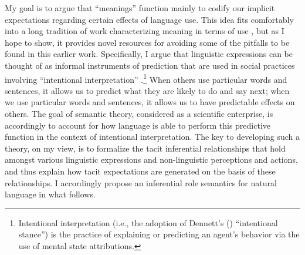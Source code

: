 My goal is to argue that ``meanings'' function mainly to codify our implicit expectations regarding certain effects of language use. This idea fits comfortably into a long tradition of work characterizing meaning in terms of use \citep{Sellars:1954,Wittgenstein:1953,Sellars:1953,Harman:1982,Block:1986,Brandom:1994,Brandom:2000,Brandom:2009,Horwich:2005}, but as I hope to show, it provides novel resources for avoiding some of the pitfalls to be found in this earlier work. Specifically, I argue that linguistic expressions can be thought of as informal instruments of prediction that are used in social practices involving ``intentional interpretation'' \citep{Dennett:1987,Brandom:1994}.\footnote{Intentional interpretation (i.e., the adoption of Dennett's (\citeyear{Dennett:1987,Dennett:1991}) ``intentional stance'') is the practice of explaining or predicting an agent’s behavior via the use of mental state attributions.} When others use particular words and sentences, it allows us to predict what they are likely to do and say next; when we use particular words and sentences, it allows us to have predictable effects on others. The goal of semantic theory, considered as a scientific enterprise, is accordingly to account for how language is able to perform this predictive function in the context of intentional interpretation. The key to developing such a theory, on my view, is to formalize the tacit inferential relationships that hold amongst various linguistic expressions and non-linguistic perceptions and actions, and thus explain how tacit expectations are generated on the basis of these relationships. I accordingly propose an inferential role semantics for natural language in what follows. 

